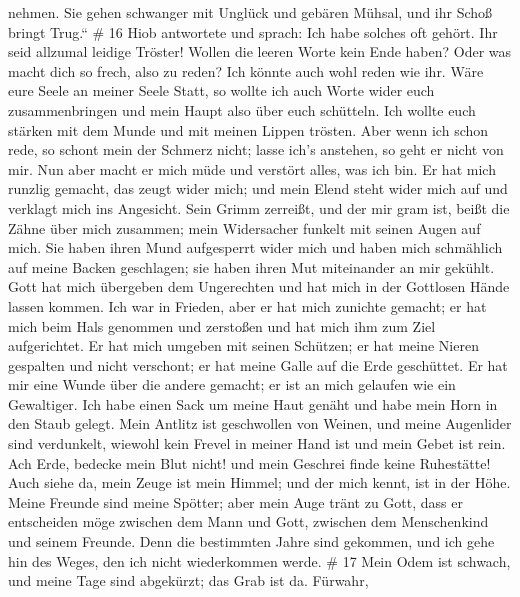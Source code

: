 nehmen.  Sie gehen schwanger mit Unglück und gebären
Mühsal, und ihr Schoß bringt Trug.`` \# 16  Hiob antwortete
und sprach:  Ich habe solches oft gehört. Ihr seid allzumal
leidige Tröster!  Wollen die leeren Worte kein Ende haben?
Oder was macht dich so frech, also zu reden?  Ich könnte
auch wohl reden wie ihr. Wäre eure Seele an meiner Seele Statt, so
wollte ich auch Worte wider euch zusammenbringen und mein Haupt also
über euch schütteln.  Ich wollte euch stärken mit dem Munde
und mit meinen Lippen trösten.  Aber wenn ich schon rede, so
schont mein der Schmerz nicht; lasse ich's anstehen, so geht er nicht
von mir.  Nun aber macht er mich müde und verstört alles,
was ich bin.  Er hat mich runzlig gemacht, das zeugt wider
mich; und mein Elend steht wider mich auf und verklagt mich ins
Angesicht.  Sein Grimm zerreißt, und der mir gram ist, beißt
die Zähne über mich zusammen; mein Widersacher funkelt mit seinen Augen
auf mich.  Sie haben ihren Mund aufgesperrt wider mich und
haben mich schmählich auf meine Backen geschlagen; sie haben ihren Mut
miteinander an mir gekühlt.  Gott hat mich übergeben dem
Ungerechten und hat mich in der Gottlosen Hände lassen kommen.
 Ich war in Frieden, aber er hat mich zunichte gemacht; er
hat mich beim Hals genommen und zerstoßen und hat mich ihm zum Ziel
aufgerichtet.  Er hat mich umgeben mit seinen Schützen; er
hat meine Nieren gespalten und nicht verschont; er hat meine Galle auf
die Erde geschüttet.  Er hat mir eine Wunde über die andere
gemacht; er ist an mich gelaufen wie ein Gewaltiger.  Ich
habe einen Sack um meine Haut genäht und habe mein Horn in den Staub
gelegt.  Mein Antlitz ist geschwollen von Weinen, und meine
Augenlider sind verdunkelt,  wiewohl kein Frevel in meiner
Hand ist und mein Gebet ist rein.  Ach Erde, bedecke mein
Blut nicht! und mein Geschrei finde keine Ruhestätte!  Auch
siehe da, mein Zeuge ist mein Himmel; und der mich kennt, ist in der
Höhe.  Meine Freunde sind meine Spötter; aber mein Auge
tränt zu Gott,  dass er entscheiden möge zwischen dem Mann
und Gott, zwischen dem Menschenkind und seinem Freunde. 
Denn die bestimmten Jahre sind gekommen, und ich gehe hin des Weges, den
ich nicht wiederkommen werde. \# 17  Mein Odem ist schwach,
und meine Tage sind abgekürzt; das Grab ist da.  Fürwahr,

